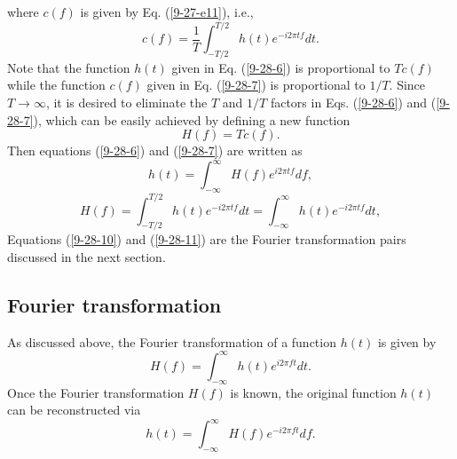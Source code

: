 \documentclass{article}
\begin{document}
where $c (f)$ is given by Eq. (\ref{9-27-e11}), i.e.,
\begin{equation}
  \label{9-28-7} c (f) = \frac{1}{T} \int_{- T / 2}^{T / 2} h (t) e^{- i 2 \pi
  t f} d t.
\end{equation}
Note that the function $h (t)$ given in Eq. (\ref{9-28-6}) is proportional to
$T c (f)$ while the function $c (f)$ given in Eq. (\ref{9-28-7}) is
proportional to $1 / T$. Since $T \rightarrow \infty$, it is desired to
eliminate the $T$ and $1 / T$ factors in Eqs. (\ref{9-28-6}) and
(\ref{9-28-7}), which can be easily achieved by defining a new function
\begin{equation}
  H (f) = T c (f) .
\end{equation}
Then equations (\ref{9-28-6}) and (\ref{9-28-7}) are written as
\begin{equation}
  \label{9-28-10} h (t) = \int_{- \infty}^{\infty} H (f) e^{i 2 \pi t f} d f,
\end{equation}
\begin{equation}
  \label{9-28-11} H (f) = \int_{- T / 2}^{T / 2} h (t) e^{- i 2 \pi t f} d t =
  \int_{- \infty}^{\infty} h (t) e^{- i 2 \pi t f} d t,
\end{equation}
Equations (\ref{9-28-10}) and (\ref{9-28-11}) are the Fourier transformation
pairs discussed in the next section.

\subsection{Fourier transformation}

As discussed above, the Fourier transformation of a function $h (t)$ is given
by
\begin{equation}
  \label{10-3-e1} H (f) = \int_{- \infty}^{\infty} h (t) e^{i 2 \pi f t} d t.
\end{equation}
Once the Fourier transformation $H (f)$ is known, the original function $h
(t)$ can be reconstructed via
\begin{equation}
  \label{10-11-3} h (t) = \int_{- \infty}^{\infty} H (f) e^{- i 2 \pi f t} d
  f.
\end{equation}
\end{document}
